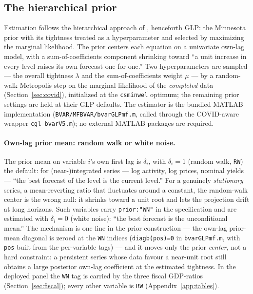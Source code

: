 \documentclass[11pt]{article}
\theoremstyle{plain}
\theoremstyle{remark}
\begin{document}
\subsection{The hierarchical prior}\label{sec:prior}

Estimation follows the hierarchical approach of \citet{Giannone2015},
henceforth GLP: the Minnesota prior
\citep{Litterman1986, DoanLittermanSims1984} with its tightness treated
as a hyperparameter and selected by maximizing the marginal likelihood.
The prior centers each equation on a univariate own-lag model, with a
sum-of-coefficients component \citep{DoanLittermanSims1984} shrinking
toward ``a unit increase in every level raises its own forecast one for
one.'' Two hyperparameters are sampled --- the overall tightness
$\lambda$ and the sum-of-coefficients weight $\mu$ --- by a
random-walk Metropolis step on the marginal likelihood of the
\emph{completed} data (Section~\ref{sec:covid}), initialized at the
\texttt{csminwel} optimum; the remaining prior settings are held at
their GLP defaults. The estimator is the bundled MATLAB implementation
(\texttt{BVAR/MFBVAR/bvarGLPmf.m}, called through the COVID-aware
wrapper \texttt{cgl\_bvarV5.m}); no external MATLAB packages are
required.

\paragraph{Own-lag prior mean: random walk or white noise.}\label{sec:ownlag}
The prior mean on variable $i$'s own first lag is $\delta_i$, with
$\delta_i = 1$ (random walk, \texttt{RW}) the default: for
(near-)integrated series --- log activity, log prices, nominal yields
--- ``the best forecast of the level is the current level.'' For a
genuinely \emph{stationary} series, a mean-reverting ratio that
fluctuates around a constant, the random-walk center is the wrong null:
it shrinks toward a unit root and lets the projection drift at long
horizons. Such variables carry \texttt{prior:"WN"} in the specification
and are estimated with $\delta_i = 0$ (white noise): ``the best forecast
is the unconditional mean.'' The mechanism is one line in the prior
construction --- the own-lag prior-mean diagonal is zeroed at the
\texttt{WN} indices (\texttt{diagb(pos)=0} in \texttt{bvarGLPmf.m}, with
\texttt{pos} built from the per-variable tags) --- and it moves only the
prior \emph{center}, not a hard constraint: a persistent series whose
data favour a near-unit root still obtains a large posterior own-lag
coefficient at the estimated tightness. In the deployed panel the
\texttt{WN} tag is carried by the three fiscal GDP-ratios
(Section~\ref{sec:fiscal}); every other variable is \texttt{RW}
(Appendix~\ref{app:tables}).
\end{document}
